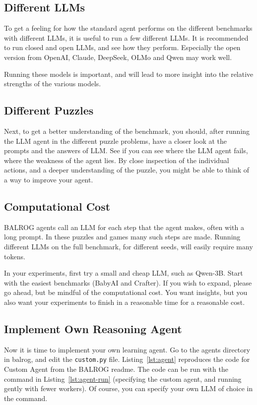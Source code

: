 \subsection{Different LLMs}

To get a feeling for how the standard agent performs on the different benchmarks with different LLMs, it is useful to run a few different LLMs. %
It is  recommended to run closed and open LLMs, and see how they perform. Especially the open version from OpenAI, Claude, DeepSeek, OLMo and Qwen may work  well. 

Running these models is important, and  will lead to more insight into the relative strengths of the various models.

\subsection{Different Puzzles}
Next, to get a better understanding of the benchmark, you should, after running the LLM agent in the different puzzle problems, have a closer look at the prompts and the answers of LLM. See if you can see where the LLM agent fails, where the weakness of the agent lies. By close inspection of the individual actions, and a deeper understanding of the puzzle, you might be able to think of a way to improve your agent.

\subsection{Computational Cost}
BALROG agents call an LLM for each step that the agent makes, often with a long prompt. In these puzzles and games many such steps are made. Running  different LLMs on the full benchmark, for different seeds, will easily require  many tokens. 

In your experiments, first try a small and cheap LLM, such as  Qwen-3B. Start with the easiest benchmarks (BabyAI and Crafter). If you wish to expand, please go ahead, but be mindful of the computational cost. You want insights, but you also want your experiments to finish in a reasonable time for a reasonable cost.

\subsection{Implement Own Reasoning Agent}
Now it is time to implement your own learning agent.
Go to the agents directory in balrog, and edit the \verb|custom.py| file.
Listing~\ref{lst:agent} reproduces the code for Custom Agent from the BALROG readme. The code can be run with the command in Listing~\ref{lst:agent-run} (specifying the custom agent, and running gently with fewer workers). Of course, you can specify your own LLM of choice in the command.

